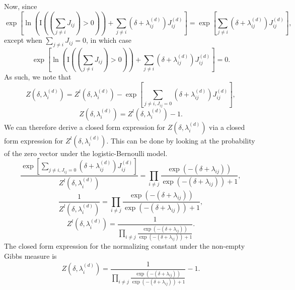 \documentclass[a4paper]{article}
\begin{document}
  Now, since $$ \exp\left[ \ln\left(\text{I}\left( \left(\sum_{j\neq i} J_{ij}\right) > 0 \right)\right) + \sum_{j\neq i} (\delta+\lambda_{ij}^{(d)})J_{ij}^{(d)} \right] = \exp\left[  \sum_{j\neq i} (\delta+\lambda_{ij}^{(d)})J_{ij}^{(d)} \right],$$ except when $\sum_{j\neq i} J_{ij}=0$, in which case $$\exp\left[ \ln\left(\text{I}\left( \left(\sum_{j\neq i} J_{ij}\right) > 0 \right)\right) + \sum_{j\neq i} (\delta+\lambda_{ij}^{(d)})J_{ij}^{(d)} \right] = 0.$$ As such, we note that $$Z(\delta,\lambda_i^{(d)}) = Z^{l}(\delta,\lambda_i^{(d)}) -  \exp\left[  \sum_{j\neq i, J_{ij}=0} (\delta+\lambda_{ij}^{(d)})J_{ij}^{(d)} \right],$$
  $$Z(\delta,\lambda_i^{(d)}) = Z^{l}(\delta,\lambda_i^{(d)}) -  1.$$ We can therefore derive a closed form expression for $Z(\delta,\lambda_i^{(d)})$ via a closed form expression for $Z^{l}(\delta,\lambda_i^{(d)})$. This can be done by looking at the probability of the zero vector under the logistic-Bernoulli model. $$\frac{\exp\left[  \sum_{j\neq i, J_{ij}=0} (\delta+\lambda_{ij}^{(d)})J_{ij}^{(d)} \right]}{Z^{l}(\delta,\lambda_i^{(d)})} = \prod_{i\neq j }   \frac{ \exp{(-(\delta+\lambda_{ij}))}}{\exp{(-(\delta+\lambda_{ij}))} + 1}, $$
  $$\frac{1}{Z^{l}(\delta,\lambda_i^{(d)})} = \prod_{i\neq j }   \frac{ \exp{(-(\delta+\lambda_{ij}))}}{\exp{(-(\delta+\lambda_{ij}))} + 1}, $$
    $$Z^{l}(\delta,\lambda_i^{(d)}) = \frac{1}{\prod_{i\neq j }   \frac{ \exp{(-(\delta+\lambda_{ij}))}}{\exp{(-(\delta+\lambda_{ij}))} + 1}}.$$ The closed form expression for the normalizing constant under the non-empty Gibbs measure is $$Z(\delta,\lambda_i^{(d)}) = \frac{1}{\prod_{i\neq j } \frac{ \exp{(-(\delta+\lambda_{ij}))}}{\exp{(-(\delta+\lambda_{ij}))} + 1}}-1.$$
  
     
       
\end{document}
